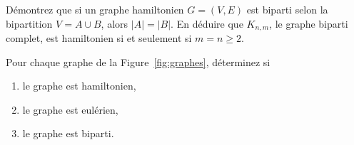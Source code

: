 
\begin{exo}
D\'emontrez que si un graphe hamiltonien $G = (V,E)$ est biparti selon la bipartition $V = A \cup B$, alors $|A|= |B|$. En d\'eduire que $K_{n,m}$, le graphe biparti complet, est hamiltonien si et seulement si $m=n \geq 2$.

\end{exo}


\begin{exo}
Pour chaque graphe de la Figure~\ref{fig:graphes}, d\'eterminez si 
\begin{enumerate}
\item le graphe est hamiltonien,
\item le graphe est eul\'erien,
\item le graphe est biparti.
\end{enumerate}
\end{exo}



